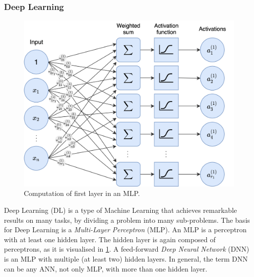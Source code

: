 \subsubsection{Deep Learning} \label{sec:deep-learning}
\begin{figure} %
    \centering
    \includegraphics[width = 0.9\linewidth]{images/MLP.png}
    \caption{Computation of first layer in an MLP.}
    \label{fig:MLP}
\end{figure}

Deep Learning \cite{goodfellow_deep_2016} (DL) is a type of Machine Learning that achieves remarkable results on many tasks, by dividing a problem into many sub-problems. The basis for Deep Learning is a \textit{Multi-Layer Perceptron} (MLP). An MLP is a perceptron with at least one hidden layer. The hidden layer is again composed of perceptrons, as it is visualised in \cref{fig:MLP}. A feed-forward \textit{Deep Neural Network} (DNN) is an MLP with multiple (at least two) hidden layers. In general, the term DNN can be any ANN, not only MLP, with more than one hidden layer.

